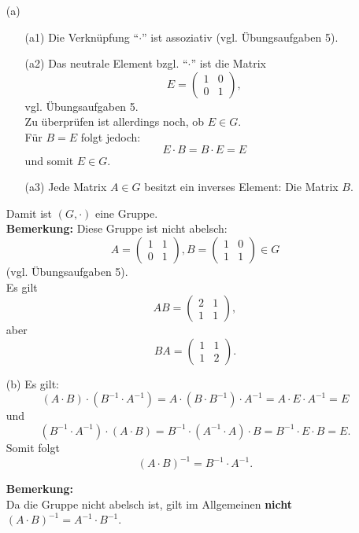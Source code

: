 \documentclass[
				a4paper,
				10pt
			]
			{scrartcl}
\begin{document}
\begin{itemize}
	\item[(a)] 
		\begin{itemize}
			\item[(a1)] Die Verkn\"upfung ``$\cdot$'' ist assoziativ (vgl. \"Ubungsaufgaben 5). 
			\item[(a2)] Das neutrale Element bzgl. ``$\cdot$'' ist die Matrix
					$$
						E =
							\begin{pmatrix}
								1	& 0	\\
								0	& 1	
							\end{pmatrix},
					$$
					vgl.  \"Ubungsaufgaben 5. \\
					Zu \"uberpr\"ufen ist allerdings noch, ob $E\in G$.\\
					F\"ur $B=E$ folgt jedoch:
					$$
						E\cdot B = B\cdot E = E
					$$
					und somit $E\in G$.
			\item[(a3)] Jede Matrix $A\in G$ besitzt ein inverses Element: Die Matrix $B$. 
		\end{itemize}
		
		Damit ist  $(G,\cdot)$  eine Gruppe.\\
		
		\textbf{Bemerkung:} Diese Gruppe ist nicht abelsch: 
		$$
			A =
				\begin{pmatrix}
					1	&	1\\
					0	&	1
				\end{pmatrix},
			B =
				\begin{pmatrix}
					1	&	0\\
					1	&	1
				\end{pmatrix}
			\in G
		$$
		(vgl. \"Ubungsaufgaben 5).\\
		Es gilt
		$$
			AB =
				\begin{pmatrix}
					2	&	1\\
					1	&	1
				\end{pmatrix},				
		$$
		aber
		$$
			BA =
				\begin{pmatrix}
					1	&	1\\
					1	&	2
				\end{pmatrix}.			
		$$	
	\item[(b)]  Es gilt:
			$$
				(A\cdot B)\cdot(B^{-1}\cdot A^{-1} ) 
				=
				A\cdot (B\cdot B^{-1})\cdot A^{-1} 
				=
				A \cdot E \cdot A^{-1} 
				= 
				E
			$$
			und
			$$
				(B^{-1}\cdot A^{-1} ) \cdot (A\cdot B)
				=
				B^{-1}\cdot (A^{-1}  \cdot A) \cdot B
				=
				B^{-1}\cdot E \cdot B
				=
				E.
			$$
			Somit folgt
			$$
				(A\cdot B)^{-1} = B^{-1}\cdot A^{-1}.
			$$
			
			\textbf{Bemerkung:}\\ 
			Da die Gruppe nicht abelsch ist, gilt im Allgemeinen \textbf{nicht} $(A\cdot B)^{-1} = A^{-1}\cdot B^{-1}$.
			
\end{itemize}
\end{document}
